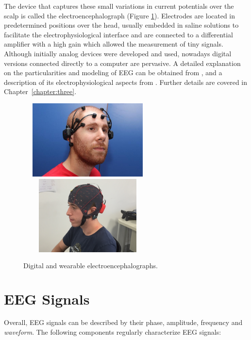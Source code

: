 
The device that captures these small variations in current potentials over the scalp is called the electroencephalograph (Figure \ref{fig:digitalelectroencephalograph}).  Electrodes are located in predetermined positions over the head, usually embedded in saline solutions to facilitate the electrophysiological interface and are connected to a differential amplifier with a high gain which allowed the measurement of tiny signals. Although initially analog devices were developed and used, nowadays digital versions connected directly to a computer are pervasive.  A detailed explanation on the particularities and modeling of EEG can be obtained from \cite{Jackson2014}, and a description of its electrophysiological aspects from \cite{Haberman2012}.  Further details are covered in Chapter~\ref{chapter:three}. 

\begin{figure}[]
\centering
\includegraphics[height=4cm,width=7cm]{images/emotivsubject.jpg}
\includegraphics[height=4cm,width=7cm]{images/gTecsubject.jpg}
\caption[Wearable portable Digital Electroencephalograph]{Digital and wearable electroencephalographs.}
\label{fig:digitalelectroencephalograph}
\end{figure}

\section{EEG Signals}

Overall, EEG signals can be described by their phase, amplitude,  frequency and \textit{waveform}.  The following components regularly  characterize EEG signals:

